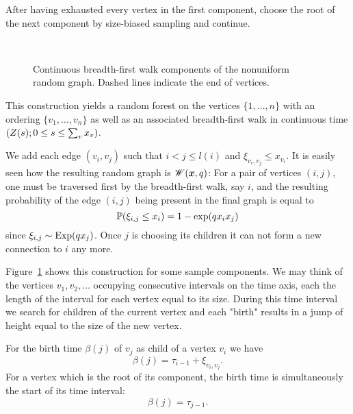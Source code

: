 After having exhausted every vertex in the first component, 
choose the root of the next component by size-biased sampling and continue.

\begin{figure}[H]
	\centering
	\\
	
	\centering
	
	\caption{Continuous breadth-first walk components of the nonuniform random graph. Dashed lines indicate the end of vertices.}
	\label{F: nonu bf-walk}
\end{figure} 

This construction yields a random forest on the vertices $\{1,  \dots, n\}$
with an ordering $\{v_1, \dots, v_n\}$ 
as well as an associated breadth-first walk in continuous time $(Z(s); 0 \leq s \leq \sum_vx_v)$.

We add each edge $(v_i, v_j)$ such that $i < j \leq l(i)$ and $\xi_{v_i, v_j} \leq x_{v_i}$.
It is easily seen how the resulting random graph is $\mathscr{W}(\boldsymbol{x}, q)$:
For a pair of vertices $(i, j)$, one must be traversed first by the breadth-first walk, say $i$,
and the resulting probability of the edge $(i,j)$ being present in the final graph is equal to
\begin{equation}
	\mathbb{P}(\xi_{i,j} \leq x_i ) = 1 - \exp(q x_i x_j)
\end{equation}
since $\xi_{i,j} \sim \operatorname*{Exp}(qx_j)$.
Once $j$ is choosing its children it can not form a new connection to $i$ any more.


Figure~\ref{F: nonu bf-walk} shows this construction for some sample components. 
We may think of the vertices $v_1, v_2, \dots$ occupying consecutive intervals on the time axis,
each the length of the interval for each vertex equal to its size.
During this time interval we search for children of the current vertex 
and each "birth" results in a jump of height equal to the size of the new vertex.

For the birth time $\beta(j)$ of $v_j$ as child of a vertex $v_i$ we have
\begin{equation}
	\beta(j) = \tau_{i-1} + \xi_{v_i, v_j}.
\end{equation}
For a vertex which is the root of its component, the birth time is simultaneously the start of its time interval:
\begin{equation}
	\beta(j) = \tau_{j-1}.
\end{equation}


